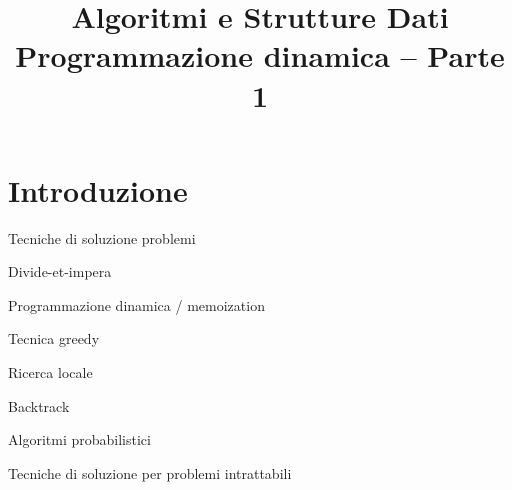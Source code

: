 

\usepackage{epigraph}
\usepackage[normalem]{ulem}
\usepackage{xcolor}
\usepackage{colortbl}
\usepackage{tikz}
\usepackage[normalem]{ulem}
\usepackage[absolute,overlay]{textpos}
\usetikzlibrary{trees}
\usetikzlibrary{shapes}
\usetikzlibrary{positioning}

\setlength{\epigraphwidth}{6cm}

\usepackage{xmpmulti}
\usepackage{listings}


\newcommand*\circled[1]{\tikz[baseline=(char.base)]{
      \node[circle,ball color=blue, shade, 
 color=white,inner sep=1.2pt] (char) {\tiny #1};}}


\title[ASD - Programmazione Dinamica]{\textbf{Algoritmi e Strutture Dati}\\[24pt]Programmazione dinamica -- Parte 1}

\graphicspath{{figs/13/}}





\FrameTitle{}

\FrameContent


\section{Introduzione}

\begin{frame}{Tecniche di soluzione problemi}

\BIL
\item Divide-et-impera 
\item Programmazione dinamica / memoization
\item Tecnica greedy
\item Ricerca locale 
\item Backtrack
\item Algoritmi probabilistici
\item Tecniche di soluzione per problemi intrattabili
\EIL

\end{frame}


